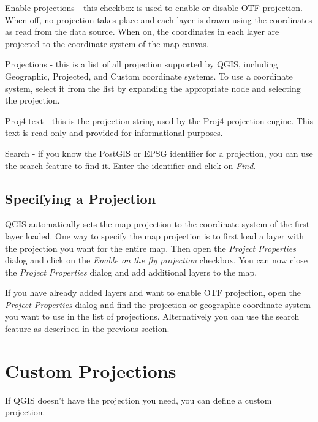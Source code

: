 \begin{compactenum}
\item Enable projections - this checkbox is used to enable or disable OTF
projection. When off, no projection takes place and each layer
is drawn using the coordinates as read from the data source. When on, the
coordinates in each layer are projected to the coordinate system of the map
canvas.
\item Projections - this is a list of all projection supported by QGIS,
including Geographic, Projected, and Custom coordinate systems. To use a
coordinate system, select it from the list by expanding the appropriate node
and selecting the projection.
\item Proj4 text - this is the projection string used by the Proj4 projection
engine. This text is read-only and provided for informational purposes.
\item Search - if you know the PostGIS or EPSG identifier for a projection,
you can use the search feature to find it. Enter the identifier and click on
\textit{Find}.

\end{compactenum}
\subsection{Specifying a Projection}
QGIS automatically sets the map projection to the coordinate system of the first
layer loaded. One way to specify the map projection is to first load a layer
with the projection you want for the entire map. Then open the \textit{Project Properties} 
dialog and click on the \textit{Enable on the fly projection} checkbox. You
can now close the \textit{Project Properties} dialog and add additional layers
to the map. 

If you have already added layers and want to enable OTF projection, open the 
\textit{Project Properties} dialog and find the projection or geographic
coordinate system you want to use in the list of projections. Alternatively
you can use the search feature as described in the previous section.

\section{Custom Projections}
If QGIS doesn't have the projection you need, you can define a custom
projection. 

